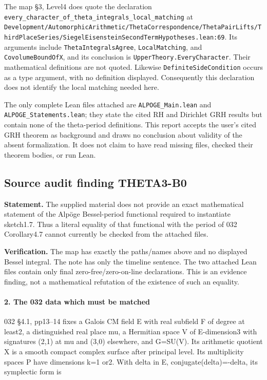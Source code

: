 The map §3, Level4 does quote the declaration \texttt{every\_character\_of\_theta\_integrals\_local\_matching} at \texttt{Development/AutomorphicArithmetic/ThetaCorrespondence/ThetaPairLifts/ThirdPlaceSeries/SiegelEisensteinSecondTermHypotheses.lean:69}. Its arguments include \texttt{ThetaIntegralsAgree}, \texttt{LocalMatching}, and \texttt{CovolumeBoundOfX}, and its conclusion is \texttt{UpperTheory.EveryCharacter}. Their mathematical definitions are not quoted. Likewise \texttt{DefiniteSideCondition} occurs as a type argument, with no definition displayed. Consequently this declaration does not identify the local matching needed here.

The only complete Lean files attached are \texttt{ALPOGE\_Main.lean} and \texttt{ALPOGE\_Statements.lean}; they state the cited RH and Dirichlet GRH results but contain none of the theta-period definitions. This report accepts the user's cited GRH theorem as background and draws no conclusion about validity of the absent formalization. It does not claim to have read missing files, checked their theorem bodies, or run Lean.

\subsection{Source audit finding THETA3-B0}\label{source-audit-finding-theta3-b0}\label{B0}

\textbf{Statement.} The supplied material does not provide an exact mathematical statement of the Alpöge Bessel-period functional required to instantiate sketch1.7. Thus a literal equality of that functional with the period of 032 Corollary4.7 cannot currently be checked from the attached files.

\textbf{Verification.} The map has exactly the paths/names above and no displayed Bessel integral. The note has only the timeline sentence. The two attached Lean files contain only final zero-free/zero-on-line declarations. This is an evidence finding, not a mathematical refutation of the existence of such an equality.

\paragraph{2. The 032 data which must be matched}\label{the-032-data-which-must-be-matched}

032 §4.1, pp13--14 fixes a Galois CM field E with real subfield F of degree at least2, a distinguished real place mu, a Hermitian space V of E-dimension3 with signatures (2,1) at mu and (3,0) elsewhere, and G=SU(V). Its arithmetic quotient X is a smooth compact complex surface after principal level. Its multiplicity spaces P have dimensions k=1 or2. With delta in E, conjugate(delta)=-delta, its symplectic form is

